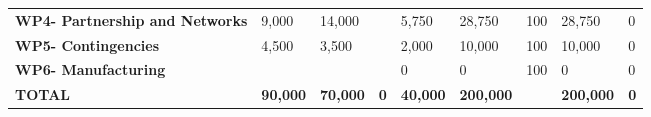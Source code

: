 \begin{table}[H]
{\begin{tabular}{p{5cm}p{2cm}p{2cm}p{2.5cm}p{2cm}p{2cm}p{2cm}p{2cm}p{2cm}}
\textbf{WP4- Partnership and Networks} & 9,000                                                                  & 14,000                                                             &                                                                                 & 5,750                                                                        & 28,750                                                                                        & 100                          & 28,750                          & 0                                                                         \\
\textbf{WP5- Contingencies}                                                        & 4,500                                                                  & 3,500                                                              &                                                                                 & 2,000                                                                        & 10,000                                                                                        & 100                          & 10,000                          & 0                                                                         \\
\textbf{WP6- Manufacturing}                                                        &                                                                        &                                                                    &                                                                                 & 0                                                                            & 0                                                                                             & 100                          & 0                               & 0                                                                         \\ \hline
\textbf{TOTAL}                                                                     & \textbf{90,000}                                                        & \textbf{70,000}                                                    & \textbf{0}                                                                      & \textbf{40,000}                                                              & \textbf{200,000}                                                                              & \textbf{}                    & \textbf{200,000}                & \textbf{0}                                                               
\\ \bottomrule[2pt]
\end{tabular} }
\end{table}



